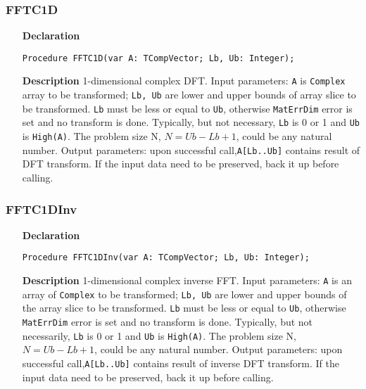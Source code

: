 \documentclass[12pt,a4paper,oneside]{report}
\newcommand{\declarationitem}[1]{\textbf{#1}}
\newcommand{\descriptiontitle}[1]{\textbf{#1}}
\newcommand{\code}[1]{\texttt{#1}}
\begin{document}
\subsubsection{FFTC1D}
\label{fftc1d}
\begin{itemize}
	\item[\declarationitem{Declaration}\hfill]
	\begin{flushleft}
	\code{Procedure FFTC1D(var A: TCompVector; Lb, Ub: Integer);}	
	\end{flushleft}
	\item[\descriptiontitle{Description}]
	1-dimensional complex DFT. Input parameters: \code{A} is \code{Complex} array to be transformed;
	\code{Lb, Ub}  are lower and upper bounds of array slice to be transformed.	\code{Lb} must be less or equal to \code{Ub}, otherwise \code{MatErrDim} error is set and no transform is done. Typically, but not necessary, \code{Lb} is 0 or 1 and \code{Ub} is \code{High(A)}. The problem size N, $N=Ub-Lb+1$, could be any natural number.	Output parameters:	upon successful call,\code{A[Lb..Ub]} contains result of DFT transform.
	If the input data need to be preserved, back it up before calling.
\end{itemize}	
\subsubsection{FFTC1DInv}
\label{fftc1dinv}
\begin{itemize}
	\item[\declarationitem{Declaration}\hfill]
	\begin{flushleft}
	\code{Procedure FFTC1DInv(var A: TCompVector; Lb, Ub: Integer);}	
	\end{flushleft}
	\item[\descriptiontitle{Description}]
	1-dimensional complex inverse FFT. Input parameters: \code{A} is an array of \code{Complex} to be transformed; \code{Lb, Ub} are lower and upper bounds of the array slice to be transformed.
	\code{Lb} must be less or equal to \code{Ub}, otherwise \code{MatErrDim} error is set and no transform is done. Typically, but not necessarily, \code{Lb} is 0 or 1 and \code{Ub} is \code{High(A)}.
	 The problem size N, $N=Ub-Lb+1$, could be any natural number.	Output parameters:	upon successful call,\code{A[Lb..Ub]} contains result of inverse DFT transform.
	If the input data need to be preserved, back it up before calling.
\end{itemize}	
\end{document}
